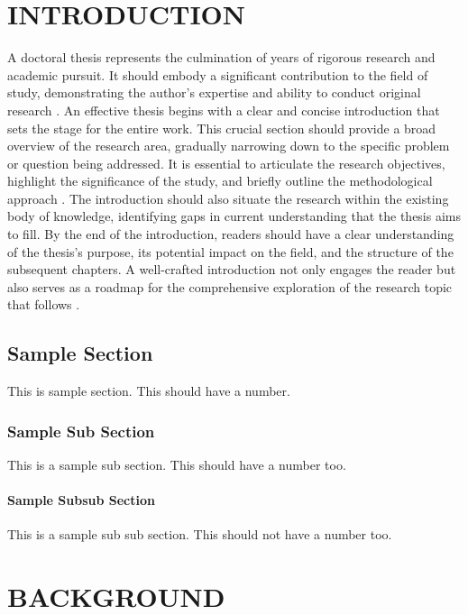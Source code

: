 \documentclass[turkish,bibstyle=apa]{kgtu}
\begin{document}
\chapter{INTRODUCTION}
A doctoral thesis represents the culmination of years of rigorous research and academic pursuit. It should embody a significant contribution to the field of study, demonstrating the author's expertise and ability to conduct original research \cite{oztoprak2023technological}. An effective thesis begins with a clear and concise introduction that sets the stage for the entire work. This crucial section should provide a broad overview of the research area, gradually narrowing down to the specific problem or question being addressed. It is essential to articulate the research objectives, highlight the significance of the study, and briefly outline the methodological approach \cite{butun2021application}. The introduction should also situate the research within the existing body of knowledge, identifying gaps in current understanding that the thesis aims to fill. By the end of the introduction, readers should have a clear understanding of the thesis's purpose, its potential impact on the field, and the structure of the subsequent chapters. A well-crafted introduction not only engages the reader but also serves as a roadmap for the comprehensive exploration of the research topic that follows \cite{oztoprak2023holistic}.
\section{Sample Section}
This is sample section. This should have a number.
\lipsum[1-3]
\subsection{Sample Sub Section}
This is a sample sub section. This should have a number too.
\lipsum[4-5]
\subsubsection{Sample Subsub Section}
This is a sample sub sub section. This should not have a number too.
\lipsum[6-7]
\chapter{BACKGROUND}
\end{document}
